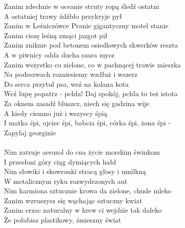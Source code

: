 \documentclass[a5paper, 10pt]{book}
\begin{document}
\begin{minipage}[t]{0.8\textwidth}
Zanim zdechnie w oceanie struty ropą śledź ostatni\\
A ostatniej trawy źdźbło przykryje pył\\
Zanim w Leśniczówce Pranie gigantyczny motel stanie\\
Zanim ciszę leśną zmąci jazgot pił\\

Zanim zniknie pod betonem osiedlowych skwerków reszta\\
A w piwnicy odda ducha szara mysz\\
Zanim wszystko co zielone, co w pachnącej trawie mieszka\\
Na podeszwach rozniesiemy wzdłuż i wszerz\\

\hspace*{5mm}Do serca przytul psa, weź na kolana kota\\
\hspace*{5mm}Weź lupę popatrz - pchła! Daj spokój, pchła to też istota\\
\hspace*{5mm}Za oknem zasadź bluszcz, niech się gadzina wije\\
\hspace*{5mm}A kiedy ciemno już i wszyscy śpią\\
\hspace*{5mm}I matka śpi, ojciec śpi, babcia śpi, córka śpi, żona śpi -\\
\hspace*{5mm}Zapylaj georginie\\
\vspace*{10mm}\\
Nim zatruje aerozol do cna życie morskim świnkom\\
I przesłoni góry ciąg dymiących hałd\\
Nim słowiki i skowronki stracą głosy i umilkną\\
W metalicznym ryku rozwydrzonych aut\\

Nim karmiona sztucznie krowa da zielone, chude mleko\\
Zanim wzruszysz się wąchając sztuczny kwiat\\
Zanim erzac naturalny w krew ci wejdzie tak daleko\\
Że polubisz plastikowy, śmieszny świat\\


\end{minipage}
\end{document}
